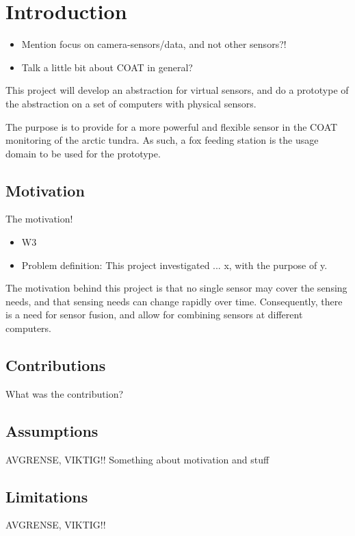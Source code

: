 \documentclass[USenglish]{uit-thesis}
\begin{document}
\tableofcontents

\listoffigures

\mainmatter

\chapter{Introduction}
\begin{itemize}
\item Mention focus on camera-sensors/data, and not other sensors?!
\item Talk a little bit about COAT in general?
\end{itemize}

This project will develop an abstraction for virtual sensors, and do a prototype of the abstraction on a set of computers with physical sensors.

The purpose is to provide for a more powerful and flexible sensor in the COAT monitoring of the arctic tundra. As such, a fox feeding station is the usage domain to be used for the prototype.


\section{Motivation}
The motivation!
\begin{itemize}
\item W3
\item Problem definition: This project investigated ... x, with the purpose of y.
\end{itemize}

The motivation  behind this project is that no single sensor may cover the sensing needs, and that sensing needs can change rapidly over time. Consequently, there is a need for sensor fusion, and allow for combining sensors at different computers.

\section{Contributions}
What was the contribution?

\section{Assumptions}
AVGRENSE, VIKTIG!!
Something about motivation and stuff

\section{Limitations}
AVGRENSE, VIKTIG!!
\end{document}
